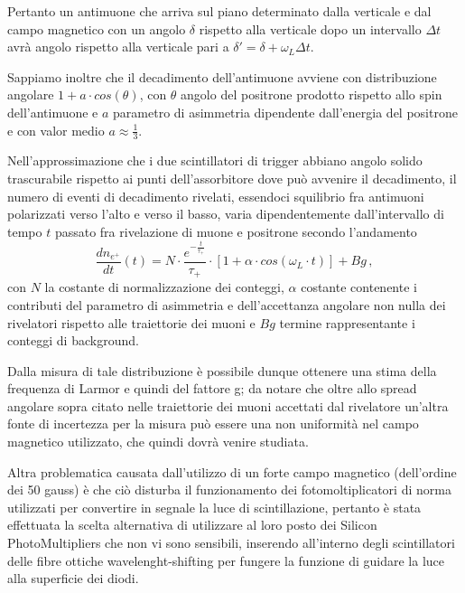 Pertanto un antimuone che arriva sul piano determinato dalla verticale e dal campo magnetico con un angolo $\delta$ rispetto alla verticale dopo un intervallo $\Delta t$ avrà angolo rispetto alla verticale pari a $\delta '=\delta + \omega_L \Delta t$. \par
Sappiamo inoltre che il decadimento dell'antimuone avviene con distribuzione angolare $1+a \cdot cos(\theta)$, con $\theta$ angolo del positrone prodotto rispetto allo spin dell'antimuone e $a$ parametro di asimmetria dipendente dall'energia del positrone e con valor medio $a\approx\frac{1}{3}$. \cite{bib:AJP-Amsler} \par
Nell'approssimazione che i due scintillatori di trigger abbiano angolo solido trascurabile rispetto ai punti dell'assorbitore dove può avvenire il decadimento, il numero di eventi di decadimento rivelati, essendoci squilibrio fra antimuoni polarizzati verso l'alto e verso il basso, varia dipendentemente dall'intervallo di tempo $t$ passato fra rivelazione di muone e positrone secondo l'andamento
\begin{equation}
\frac{dn_{e^+}}{dt}(t)=N \cdot\frac{e^{-\frac{t}{\tau_+}}}{\tau_+}\cdot[1+\alpha\cdot cos(\omega_L \cdot t)]+Bg \, ,
\end{equation}
con $N$ la costante di normalizzazione dei conteggi, $\alpha$ costante contenente i contributi del parametro di asimmetria e dell'accettanza angolare non nulla dei rivelatori rispetto alle traiettorie dei muoni e $Bg$ termine rappresentante i conteggi di background. \par
Dalla misura di tale distribuzione è possibile dunque ottenere una stima della frequenza di Larmor e quindi del fattore g; da notare che oltre allo spread angolare sopra citato nelle traiettorie dei muoni accettati dal rivelatore un'altra fonte di incertezza per la misura può essere una non uniformità nel campo magnetico utilizzato, che quindi dovrà venire studiata. \par
Altra problematica causata dall'utilizzo di un forte campo magnetico (dell'ordine dei 50 gauss) è che ciò disturba il funzionamento dei fotomoltiplicatori di norma utilizzati per convertire in segnale la luce di scintillazione, pertanto è stata effettuata la scelta alternativa di utilizzare al loro posto dei Silicon PhotoMultipliers che non vi sono sensibili, inserendo all'interno degli scintillatori delle fibre ottiche wavelenght-shifting per fungere la funzione di guidare la luce alla superficie dei diodi.

